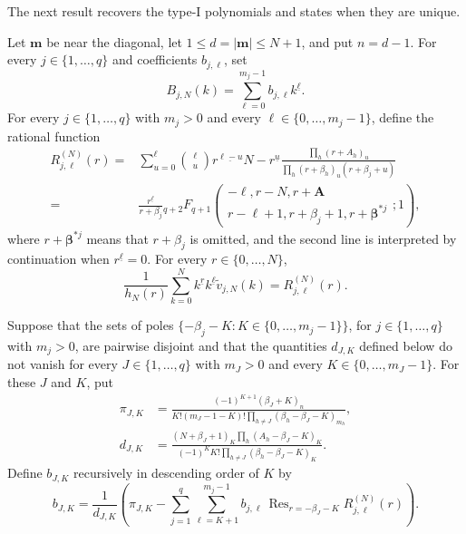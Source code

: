 \documentclass[10pt]{amsart}
\newcommand{\A}{\boldsymbol A}
\newcommand{\bbeta}{\boldsymbol\beta}
\newcommand{\mm}{\boldsymbol m}
\newcommand{\abs}[1]{\lvert#1\rvert}
\newcommand{\fall}[2]{#1^{\underline{#2}}}
\newcommand{\pFq}[5]{{}_{#1}F_{#2}\!\left(\begin{matrix}#3\\#4\end{matrix};#5\right)}
\DeclareMathOperator*{\Res}{Res}
\theoremstyle{plain}
\theoremstyle{definition}
\theoremstyle{remark}
\begin{document}
The next result recovers the type-I polynomials and states when they
are unique.

Let \(\mm\) be near the diagonal, let \(1\le d=\abs\mm\le N+1\), and
put \(n=d-1\). For every \(j\in\{1,\ldots,q\}\) and coefficients
\(b_{j,\ell}\), set
\begin{equation}
 B_{j,N}(k)=\sum_{\ell=0}^{m_j-1}b_{j,\ell}\fall{k}{\ell}.
 \label{eq:B-factorial-components}
\end{equation}
For every \(j\in\{1,\ldots,q\}\) with \(m_j>0\) and every
\(\ell\in\{0,\ldots,m_j-1\}\), define the rational function
\begin{equation}
 \begin{split}
 R_{j,\ell}^{(N)}(r)={}&
 \sum_{u=0}^{\ell}\binom\ell u
 \fall{r}{\ell-u}\fall{N-r}{u}
 \frac{\prod_h(r+A_h)_u}
 {\prod_h(r+\beta_h)_u(r+\beta_j+u)}\\
 ={}&\frac{\fall{r}{\ell}}{r+\beta_j}
 \pFq{q+2}{q+1}
 {-\ell,r-N,r+\A}
 {r-\ell+1,r+\beta_j+1,r+\bbeta^{*j}}{1},
 \end{split}
 \label{eq:R-kernel}
\end{equation}
where \(r+\bbeta^{*j}\) means that \(r+\beta_j\) is omitted, and the
second line is interpreted by continuation when \(\fall{r}{\ell}=0\).
For every \(r\in\{0,\ldots,N\}\),
\begin{equation}
 \frac{1}{h_N(r)}
 \sum_{k=0}^N\fall{k}{r}\fall{k}{\ell}\widetilde v_{j,N}(k)
 =R_{j,\ell}^{(N)}(r).
 \label{eq:R-pairing}
\end{equation}

Suppose that the sets of poles
\(\{-\beta_j-K:K\in\{0,\ldots,m_j-1\}\}\), for
\(j\in\{1,\ldots,q\}\) with \(m_j>0\), are pairwise disjoint and that the
quantities \(d_{J,K}\) defined below do not vanish for every
\(J\in\{1,\ldots,q\}\) with \(m_J>0\) and every
\(K\in\{0,\ldots,m_J-1\}\). For these \(J\) and \(K\), put
\begin{align}
 \pi_{J,K}
 &=\frac{(-1)^{K+1}(\beta_J+K)_n}
 {K!(m_J-1-K)!\prod_{h\ne J}
 (\beta_h-\beta_J-K)_{m_h}},
 \label{eq:target-residue}\\
 d_{J,K}
 &=\frac{(N+\beta_J+1)_K
 \prod_h(A_h-\beta_J-K)_K}
 {(-1)^KK!\prod_{h\ne J}(\beta_h-\beta_J-K)_K}.
 \label{eq:diagonal-residue}
\end{align}
Define \(b_{J,K}\) recursively in descending order of \(K\) by
\begin{equation}
 b_{J,K}=\frac{1}{d_{J,K}}
 \left(\pi_{J,K}-
 \sum_{j=1}^q\sum_{\ell=K+1}^{m_j-1}
 b_{j,\ell}\,
 \Res_{r=-\beta_J-K}R_{j,\ell}^{(N)}(r)\right).
 \label{eq:triangular-B-reconstruction}
\end{equation}
\end{document}
